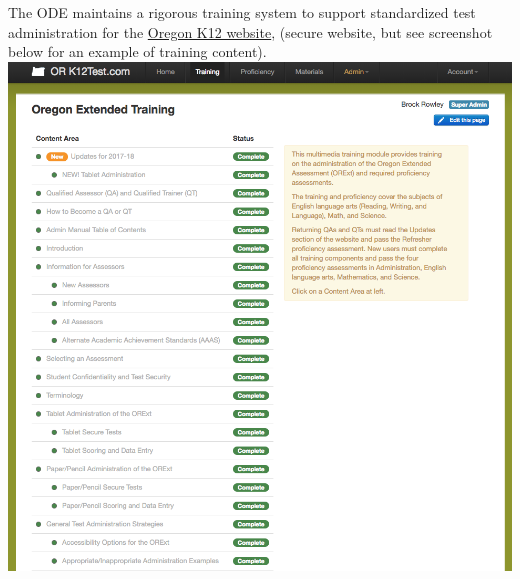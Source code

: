 \documentclass[]{article}
\begin{document}
The ODE maintains a rigorous training system to support standardized
test administration for the \color{link}
\href{https://or.k12test.com}{Oregon K12 website}\color{black}, (secure
website, but see screenshot below for an example of training content).
\FloatBarrier
\includegraphics{Figures/TrainingSite/TrainingSite.png}
\end{document}
